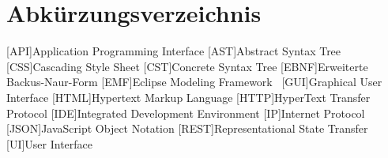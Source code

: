 \chapter*{Abkürzungsverzeichnis}


\begin{acronym}
    [API]{Application Programming Interface}
    [AST]{Abstract Syntax Tree}
    [CSS]{Cascading Style Sheet}
    [CST]{Concrete Syntax Tree}
    [EBNF]{Erweiterte Backus-Naur-Form}
    [EMF]{Eclipse Modeling Framework~\cite{emf}}
    [GUI]{Graphical User Interface}
    [HTML]{Hypertext Markup Language}
    [HTTP]{HyperText Transfer Protocol}
    [IDE]{Integrated Development Environment}
    [IP]{Internet Protocol}
    [JSON]{JavaScript Object Notation}
    [REST]{Representational State Transfer}
    [UI]{User Interface}
\end{acronym}

